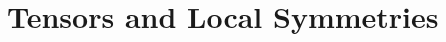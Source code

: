 \documentclass[12pt,a4paper]{article}
\begin{document}



\newcommand{\dd}{\mathrm d}











\section{Tensors and Local Symmetries}
\end{document}
